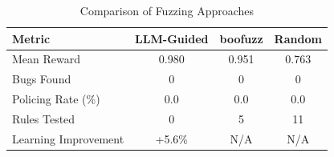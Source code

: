 
\begin{table}[htbp]
\centering
\caption{Comparison of Fuzzing Approaches}
\label{tab:fuzzer-comparison}
\begin{tabular}{lccc}
\toprule
\textbf{Metric} & \textbf{LLM-Guided} & \textbf{boofuzz} & \textbf{Random} \\
\midrule
Mean Reward & 0.980 & 0.951 & 0.763 \\
Bugs Found & 0 & 0 & 0 \\
Policing Rate (\%) & 0.0 & 0.0 & 0.0 \\
Rules Tested & 0 & 5 & 11 \\
Learning Improvement & +5.6\% & N/A & N/A \\
\bottomrule
\end{tabular}
\end{table}